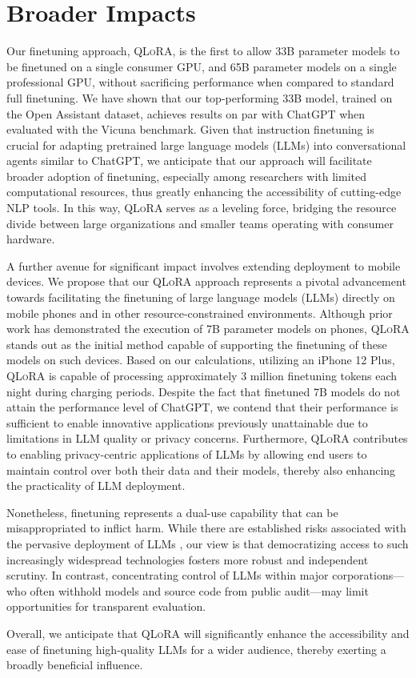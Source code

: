 \section{Broader Impacts}

Our finetuning approach, \textsc{QLoRA}, is the first to allow 33B parameter models to be finetuned on a single consumer GPU, and 65B parameter models on a single professional GPU, without sacrificing performance when compared to standard full finetuning. We have shown that our top-performing 33B model, trained on the Open Assistant dataset, achieves results on par with ChatGPT when evaluated with the Vicuna benchmark. Given that instruction finetuning is crucial for adapting pretrained large language models (LLMs) into conversational agents similar to ChatGPT, we anticipate that our approach will facilitate broader adoption of finetuning, especially among researchers with limited computational resources, thus greatly enhancing the accessibility of cutting-edge NLP tools. In this way, \textsc{QLoRA} serves as a leveling force, bridging the resource divide between large organizations and smaller teams operating with consumer hardware.

A further avenue for significant impact involves extending deployment to mobile devices. We propose that our \textsc{QLoRA} approach represents a pivotal advancement towards facilitating the finetuning of large language models (LLMs) directly on mobile phones and in other resource-constrained environments. Although prior work has demonstrated the execution of 7B parameter models on phones, \textsc{QLoRA} stands out as the initial method capable of supporting the finetuning of these models on such devices. Based on our calculations, utilizing an iPhone 12 Plus, \textsc{QLoRA} is capable of processing approximately 3 million finetuning tokens each night during charging periods. Despite the fact that finetuned 7B models do not attain the performance level of ChatGPT, we contend that their performance is sufficient to enable innovative applications previously unattainable due to limitations in LLM quality or privacy concerns. Furthermore, \textsc{QLoRA} contributes to enabling privacy-centric applications of LLMs by allowing end users to maintain control over both their data and their models, thereby also enhancing the practicality of LLM deployment.

Nonetheless, finetuning represents a dual-use capability that can be misappropriated to inflict harm. While there are established risks associated with the pervasive deployment of LLMs \citep{bommasani2021opportunities,bender2021dangers}, our view is that democratizing access to such increasingly widespread technologies fosters more robust and independent scrutiny. In contrast, concentrating control of LLMs within major corporations—who often withhold models and source code from public audit—may limit opportunities for transparent evaluation.

Overall, we anticipate that \textsc{QLoRA} will significantly enhance the accessibility and ease of finetuning high-quality LLMs for a wider audience, thereby exerting a broadly beneficial influence.

